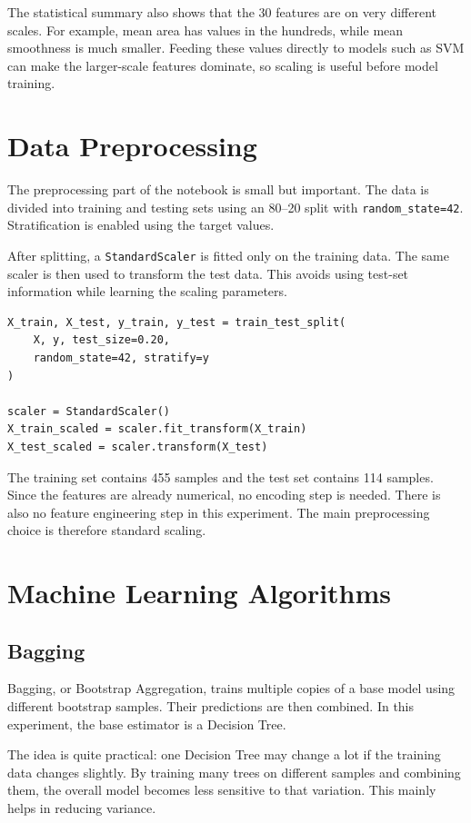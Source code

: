 \documentclass[12pt,a4paper]{article}
\begin{document}
The statistical summary also shows that the 30 features are on very different scales. For example, mean area has values in the hundreds, while mean smoothness is much smaller. Feeding these values directly to models such as SVM can make the larger-scale features dominate, so scaling is useful before model training.

\section{Data Preprocessing}
The preprocessing part of the notebook is small but important. The data is divided into training and testing sets using an 80--20 split with \texttt{random\_state=42}. Stratification is enabled using the target values.

After splitting, a \texttt{StandardScaler} is fitted only on the training data. The same scaler is then used to transform the test data. This avoids using test-set information while learning the scaling parameters.

\begin{lstlisting}[caption={Data splitting and feature scaling used in the notebook}]
X_train, X_test, y_train, y_test = train_test_split(
    X, y, test_size=0.20,
    random_state=42, stratify=y
)

scaler = StandardScaler()
X_train_scaled = scaler.fit_transform(X_train)
X_test_scaled = scaler.transform(X_test)
\end{lstlisting}

The training set contains 455 samples and the test set contains 114 samples. Since the features are already numerical, no encoding step is needed. There is also no feature engineering step in this experiment. The main preprocessing choice is therefore standard scaling.

\section{Machine Learning Algorithms}

\subsection{Bagging}
Bagging, or Bootstrap Aggregation, trains multiple copies of a base model using different bootstrap samples. Their predictions are then combined. In this experiment, the base estimator is a Decision Tree.

The idea is quite practical: one Decision Tree may change a lot if the training data changes slightly. By training many trees on different samples and combining them, the overall model becomes less sensitive to that variation. This mainly helps in reducing variance.
\end{document}
